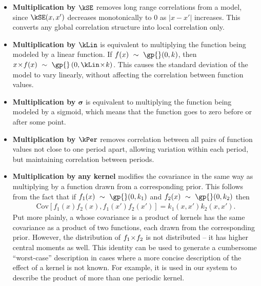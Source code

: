 \begin{itemize}
\item {\bf Multiplication by $\kSE$} removes long range correlations from a model, since $\kSE(x,x')$ decreases monotonically to 0 as $|x - x'|$ increases.
This converts any global correlation structure into local correlation only.

\item {\bf Multiplication by $\kLin$} is equivalent to multiplying the function being modeled by a linear function.
If $f(x) \dist \gp{}(0, \kernel)$, then $x \kerntimes f(x) \dist \gp{}\left(0, \kLin \kerntimes k \right)$.
This causes the standard deviation of the model to vary linearly, without affecting the correlation between function values.

\item {\bf Multiplication by $\boldsymbol\sigma$} is equivalent to multiplying the function being modeled by a sigmoid, which means that the function goes to zero before or after some point.

\item {\bf Multiplication by $\kPer$}
removes correlation between all pairs of function values not close to one period apart, allowing variation within each period, but maintaining correlation between periods.

\item {\bf Multiplication by any kernel}
modifies the covariance in the same way as multiplying by a function drawn from a corresponding \gp{} prior.
This follows from the fact that if ${f_1(x) \dist \gp{}(0, \kernel_1)}$ and ${f_2(x) \dist \gp{}(0, \kernel_2)}$ then
%
\begin{align}
{\textrm{Cov} \left[f_1(x)f_2(x), f_1(x')f_2(x') \right] = k_1(x,x')k_2(x,x')}.
\end{align}
%
Put more plainly, a \gp{} whose covariance is a product of kernels has the same covariance as a product of two functions, each drawn from the corresponding \gp{} prior.
However, the distribution of $f_1 \! \times \! f_2$ is not \gp{} distributed -- it has higher central moments as well.
This identity can be used to generate a cumbersome ``worst-case'' description in cases where a more concise description of the effect of a kernel is not known.
For example, it is used in our system to describe the product of more than one periodic kernel.
\end{itemize}

